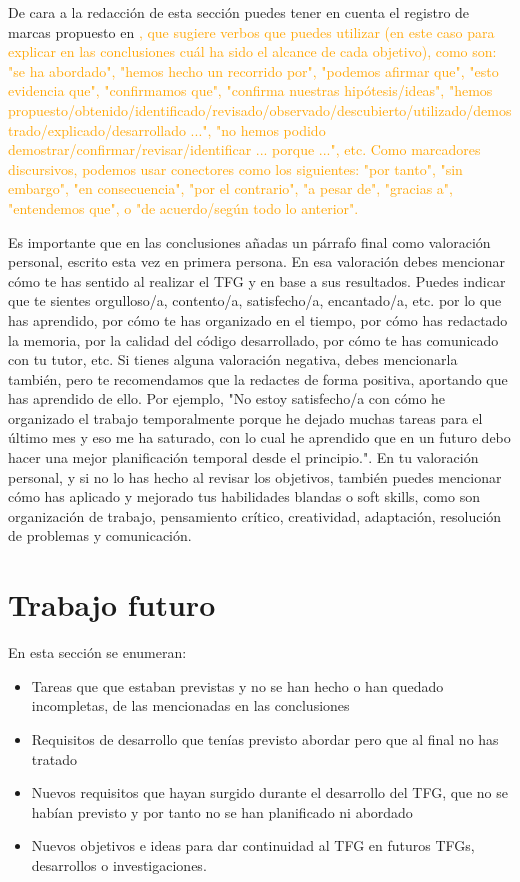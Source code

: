  De cara a la redacción de esta sección puedes tener en cuenta el registro de marcas propuesto en \cite{meza2019comunicacion} \textcolor{orange}{, que sugiere verbos que puedes utilizar (en este caso para explicar en las conclusiones cuál ha sido el alcance de cada objetivo), como son: "se ha abordado", "hemos hecho un recorrido por", "podemos afirmar que", "esto evidencia que", "confirmamos que", "confirma nuestras hipótesis/ideas", "hemos propuesto/obtenido/identificado/revisado/observado/descubierto/utilizado/demostrado/explicado/desarrollado ...",  "no hemos podido demostrar/confirmar/revisar/identificar ... porque ...", etc. Como marcadores discursivos, podemos usar conectores como los siguientes: "por tanto", "sin embargo", "en consecuencia", "por el contrario", "a pesar de", "gracias a", "entendemos que", o "de acuerdo/según todo lo anterior".}
 
Es importante que en las conclusiones añadas un párrafo final como valoración personal, escrito esta vez en primera persona. En esa valoración debes mencionar cómo te has sentido al realizar el TFG y en base a sus resultados. Puedes indicar que te sientes orgulloso/a, contento/a, satisfecho/a, encantado/a, etc. por lo que has aprendido, por cómo te has organizado en el tiempo, por cómo has redactado la memoria, por la calidad del código desarrollado, por cómo te has comunicado con tu tutor, etc. Si tienes alguna valoración negativa, debes mencionarla también, pero te recomendamos que la redactes de forma positiva, aportando que has aprendido de ello. Por ejemplo, "No estoy satisfecho/a con cómo he organizado el trabajo temporalmente porque he dejado muchas tareas para el último mes y eso me ha saturado, con lo cual he aprendido que en un futuro debo hacer una mejor planificación temporal desde el principio.". En tu valoración personal, y si no lo has hecho al revisar los objetivos, también puedes mencionar cómo has aplicado y mejorado tus habilidades blandas o soft skills, como son organización de trabajo, pensamiento crítico, creatividad, adaptación, resolución de problemas y comunicación. 

 \section{Trabajo futuro}

 En esta sección se enumeran:
 \begin{itemize}
     \item Tareas que que estaban previstas y no se han hecho o han quedado incompletas, de las mencionadas en las conclusiones
     \item Requisitos de desarrollo que tenías previsto abordar pero que al final no has tratado
     \item Nuevos requisitos que hayan surgido durante el desarrollo del TFG, que no se habían previsto y por tanto no se han planificado ni abordado
     \item Nuevos objetivos e ideas para dar continuidad al TFG en futuros TFGs, desarrollos o investigaciones.
 \end{itemize} 

